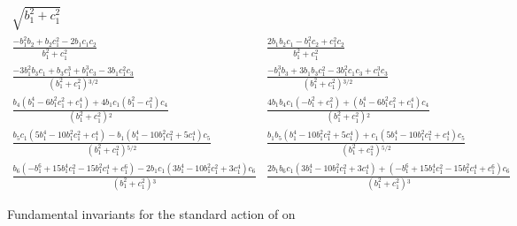 \begin{table}
\label{tab:SO2n6}
\[
\begin{array}{ll}
  \sqrt{b_1^2+c_1^2} & \\
 \frac{-b_1^2 b_2+b_2 c_1^2-2 b_1 c_1 c_2}{b_1^2+c_1^2} & \frac{2 b_1 b_2 c_1-b_1^2 c_2+c_1^2 c_2}{b_1^2+c_1^2} \\
 \frac{-3 b_1^2 b_3 c_1+b_3 c_1^3+b_1^3 c_3-3 b_1 c_1^2 c_3}{\left(b_1^2+c_1^2\right){}^{3/2}} & \frac{-b_1^3 b_3+3 b_1 b_3 c_1^2-3 b_1^2 c_1 c_3+c_1^3
c_3}{\left(b_1^2+c_1^2\right){}^{3/2}} \\
 \frac{b_4 \left(b_1^4-6 b_1^2 c_1^2+c_1^4\right)+4 b_1 c_1 \left(b_1^2-c_1^2\right) c_4}{\left(b_1^2+c_1^2\right){}^2} & \frac{4 b_1 b_4 c_1 \left(-b_1^2+c_1^2\right)+\left(b_1^4-6
b_1^2 c_1^2+c_1^4\right) c_4}{\left(b_1^2+c_1^2\right){}^2} \\
 \frac{b_5 c_1 \left(5 b_1^4-10 b_1^2 c_1^2+c_1^4\right)-b_1 \left(b_1^4-10 b_1^2 c_1^2+5 c_1^4\right) c_5}{\left(b_1^2+c_1^2\right){}^{5/2}} & \frac{b_1
b_5 \left(b_1^4-10 b_1^2 c_1^2+5 c_1^4\right)+c_1 \left(5 b_1^4-10 b_1^2 c_1^2+c_1^4\right) c_5}{\left(b_1^2+c_1^2\right){}^{5/2}} \\
 \frac{b_6 \left(-b_1^6+15 b_1^4 c_1^2-15 b_1^2 c_1^4+c_1^6\right)-2 b_1 c_1 \left(3 b_1^4-10 b_1^2 c_1^2+3 c_1^4\right) c_6}{\left(b_1^2+c_1^2\right){}^3}
& \frac{2 b_1 b_6 c_1 \left(3 b_1^4-10 b_1^2 c_1^2+3 c_1^4\right)+\left(-b_1^6+15 b_1^4 c_1^2-15 b_1^2 c_1^4+c_1^6\right) c_6}{\left(b_1^2+c_1^2\right){}^3}
\end{array}
\]
\caption[Fundametal invariants for SO(2), n=6.]{Fundamental invariants for the standard action of  on }
\end{table}


